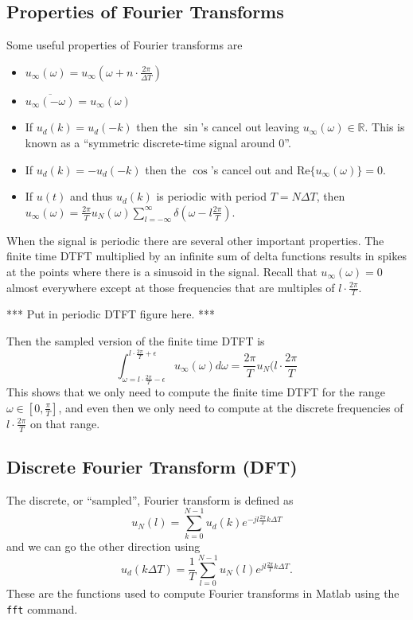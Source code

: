 \documentclass[lecture,12pt,]{pcms-l}
\newcommand{\w}{\omega}
\begin{document}
\subsection{Properties of Fourier Transforms}
Some useful properties of Fourier transforms are
\begin{itemize}
\item $u_\infty(\w) = u_\infty(\w + n\cdot \frac{2\pi}{\Delta T})$
\item $\overline{u_\infty(-\w)} = u_\infty(\w)$
\item If $u_d(k) = u_d(-k)$ then the $\sin$'s cancel out leaving $u_\infty(\w)\in\mathbb{R}$. This is known as a ``symmetric discrete-time signal around $0$''.
\item If $u_d(k) = -u_d(-k)$ then the $\cos$'s cancel out and $\text{Re}\lbrace u_\infty(\w)\rbrace = 0$.
\item If $u(t)$ and thus $u_d(k)$ is periodic with period $T=N\Delta T$, then $u_\infty(\w) = \frac{2\pi}{T}u_N(\w) \sum_{l=-\infty}^\infty \delta(\w-l\frac{2\pi}{T})$.
\end{itemize}
When the signal is periodic there are several other important properties. The finite time DTFT multiplied by an infinite sum of delta functions results in spikes at the points where there is a sinusoid in the signal. Recall that $u_\infty(\w)=0$ almost everywhere except at those frequencies that are multiples of $l\cdot \frac{2\pi}{T}$.

*** Put in periodic DTFT figure here. ***

Then the sampled version of the finite time DTFT is
$$\int_{\w=l\cdot \frac{2\pi}{T}-\epsilon}^{l\cdot \frac{2\pi}{T}+\epsilon} u_\infty(\w)d\w
= \frac{2\pi}{T}u_N(l\cdot \frac{2\pi}{T}$$
This shows that we only need to compute the finite time DTFT for the range $\w\in[0,\frac{\pi}{T}]$, and even then we only need to compute at the discrete frequencies of $l\cdot\frac{2\pi}{T}$ on that range.

\subsection{Discrete Fourier Transform (DFT)}
The discrete, or ``sampled'', Fourier transform is defined as
$$u_N(l) = \sum_{k=0}^{N-1} u_d(k) e^{-jl\frac{2\pi}{T}k\Delta T}$$
and we can go the other direction using
$$u_d(k\Delta T) = \frac{1}{T} \sum_{l=0}^{N-1} u_N(l) e^{jl\frac{2\pi}{T}k\Delta T}.$$
These are the functions used to compute Fourier transforms in Matlab using the \texttt{fft} command.
\end{document}
